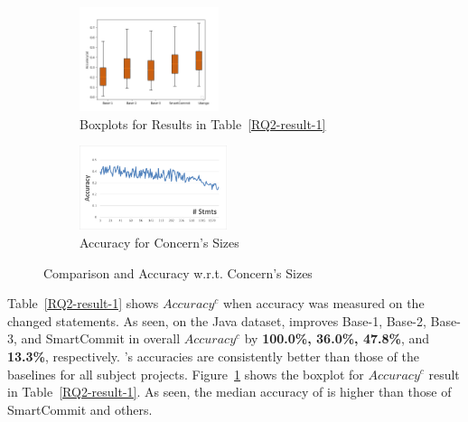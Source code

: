 \begin{figure}
  \centering
  \vspace{-12pt}
	\begin{subfigure}{0.235\textwidth}
	\centering
	\includegraphics[width=1.6in]{figures/RQ_2_1.png}
	\vspace{-8pt}
	\caption{Boxplots for Results in Table~\ref{RQ2-result-1}}
	\label{RQ2-result-2}
	\end{subfigure}
\hfill
	\begin{subfigure}{0.225\textwidth}
		\centering
		\includegraphics[width=1.7in]{figures/accuracy-concerns-java.png}
		\vspace{-8pt}
		\caption{Accuracy for Concern's Sizes}
		\label{RQ2-result-3}
	\end{subfigure}
	\label{RQ2-result-4}
	\vspace{-12pt}
	\caption{Comparison and Accuracy w.r.t. Concern's Sizes}
\end{figure}

 Table~\ref{RQ2-result-1} shows
$Accuracy^{c}$ when accuracy was measured on the changed statements.
As seen, on the Java dataset, {\tool} improves Base-1, Base-2, Base-3,
and SmartCommit in overall $Accuracy^c$ by {\bf 100.0\%, 36.0\%,
  47.8\%}, and {\bf 13.3\%}, respectively. {\tool}'s accuracies are
consistently better than those of the baselines for all subject
projects. Figure~\ref{RQ2-result-2} shows the boxplot for $Accuracy^c$
result in Table~\ref{RQ2-result-1}. As seen, the median accuracy of
{\tool} is higher than those of SmartCommit and others.


